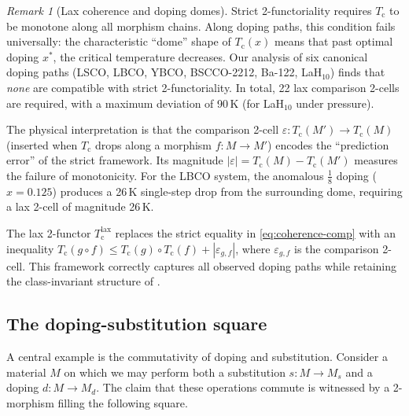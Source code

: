 \documentclass[12pt,a4paper]{article}
\theoremstyle{plain}
\theoremstyle{definition}
\theoremstyle{remark}
\newtheorem{remark}[theorem]{Remark}
\newcommand{\Tc}{T_{\mathrm{c}}}
\begin{document}
\begin{remark}[Lax coherence and doping domes]\label{rem:lax-coherence}
Strict 2-functoriality requires $\Tc$ to be monotone along all morphism
chains.  Along doping paths, this condition fails universally: the
characteristic ``dome'' shape of $\Tc(x)$ means that past optimal doping
$x^*$, the critical temperature decreases.  Our analysis of six canonical
doping paths (LSCO, LBCO, YBCO, BSCCO-2212, Ba-122, LaH$_{10}$) finds
that \emph{none} are compatible with strict 2-functoriality.  In total,
22 lax comparison 2-cells are required, with a maximum deviation of
90\,K (for LaH$_{10}$ under pressure).

The physical interpretation is that the comparison 2-cell
$\varepsilon \colon \Tc(M') \to \Tc(M)$ (inserted when $\Tc$ drops along
a morphism $f \colon M \to M'$) encodes the ``prediction error'' of the
strict framework.  Its magnitude $|\varepsilon| = \Tc(M) - \Tc(M')$
measures the failure of monotonicity.  For the LBCO system, the anomalous
$\frac{1}{8}$ doping ($x = 0.125$) produces a 26\,K single-step drop from
the surrounding dome, requiring a lax 2-cell of magnitude 26\,K.

The lax 2-functor $\Tc^{\mathrm{lax}}$ replaces the strict equality in
\eqref{eq:coherence-comp} with an inequality
$\Tc(g \circ f) \leq \Tc(g) \circ \Tc(f) + |\varepsilon_{g,f}|$,
where $\varepsilon_{g,f}$ is the comparison 2-cell.  This framework
correctly captures all observed doping paths while retaining the
class-invariant structure of .
\end{remark}

\subsection{The doping-substitution square}\label{subsec:square}

A central example is the commutativity of doping and substitution.  Consider
a material $M$ on which we may perform both a substitution
$s \colon M \to M_s$ and a doping $d \colon M \to M_d$.  The claim that
these operations commute is witnessed by a 2-morphism filling the following
square.

\begin{center}
\end{center}
\end{document}
